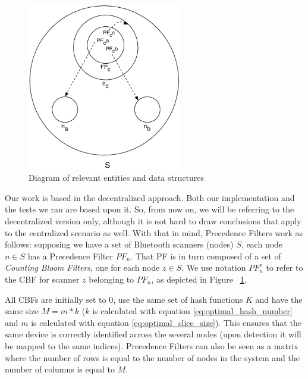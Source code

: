\begin{figure}
  \centering
  \includegraphics[width=0.60\textwidth]{images/precedence_filters.pdf}
  \caption{Diagram of relevant entities and data structures}
  \label{fig:precedence_filters}
\end{figure}

Our work is based in the decentralized approach. Both our
implementation and the tests we ran are based upon it. So,
from now on, we will be referring to the decentralized version only,
although it is not hard to draw conclusions that apply to the
centralized scenario as well.
With that in mind, Precedence Filters work as follows: supposing we
have a set of Bluetooth scanners (nodes) $S$, each node $n \in S$ has
a Precedence Filter $PF_n$. That PF is in turn composed of a set of
\emph{Counting Bloom Filters}, one for each node $z \in S$. We use
notation $PF_n^z$ to refer to the CBF for scanner $z$ belonging to
$PF_n$, as depicted in Figure ~\ref{fig:precedence_filters}.

All CBFs are initially set to 0, use the same set of hash functions
$K$ and have the same size $M = m * k$ ($k$ is calculated with
equation \ref{eq:optimal_hash_number} and $m$ is calculated with
equation \ref{eq:optimal_slice_size}). This ensures that the same
device is correctly identified across the several nodes (upon
detection it will be mapped to the same indices). Precedence Filters
can also be seen as a matrix where the number of rows is equal to the
number of nodes in the system and the number of columns is equal to $M$.

